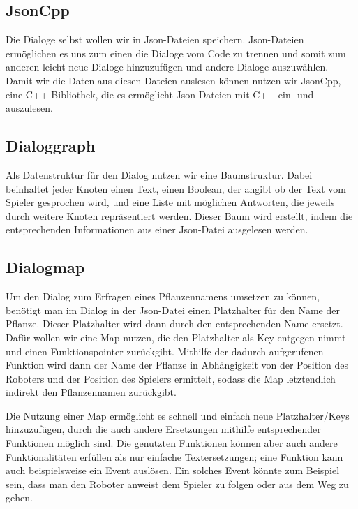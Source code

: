 \subsection{JsonCpp}

Die Dialoge selbst wollen wir in Json-Dateien speichern. Json-Dateien ermöglichen es uns zum einen die Dialoge vom Code zu trennen und somit zum anderen leicht neue Dialoge hinzuzufügen und andere Dialoge auszuwählen. Damit wir die Daten aus diesen Dateien auslesen können nutzen wir JsonCpp, eine C++-Bibliothek, die es ermöglicht Json-Dateien mit C++ ein- und auszulesen. 

\subsection{Dialoggraph}

Als Datenstruktur für den Dialog nutzen wir eine Baumstruktur. Dabei beinhaltet jeder Knoten einen Text, einen Boolean, der angibt ob der Text vom Spieler gesprochen wird, und eine Liste mit möglichen Antworten, die jeweils durch weitere Knoten repräsentiert werden. Dieser Baum wird erstellt, indem die entsprechenden Informationen aus einer Json-Datei ausgelesen werden. 

\subsection{Dialogmap}

Um den Dialog zum Erfragen eines Pflanzennamens umsetzen zu können, benötigt man im Dialog in der Json-Datei einen Platzhalter für den Name der Pflanze. Dieser Platzhalter wird dann durch den entsprechenden Name ersetzt. Dafür wollen wir eine Map nutzen, die den Platzhalter als Key entgegen nimmt und einen Funktionspointer zurückgibt. Mithilfe der dadurch aufgerufenen Funktion wird dann der Name der Pflanze in Abhängigkeit von der Position des Roboters und der Position des Spielers ermittelt, sodass die Map letztendlich indirekt den Pflanzennamen zurückgibt.  
\par
Die Nutzung einer Map ermöglicht es schnell und einfach neue Platzhalter/Keys hinzuzufügen, durch die auch andere Ersetzungen mithilfe entsprechender Funktionen möglich sind. Die genutzten Funktionen können aber auch andere Funktionalitäten erfüllen als nur einfache Textersetzungen; eine Funktion kann auch beispielsweise ein Event auslösen. Ein solches Event könnte zum Beispiel sein, dass man den Roboter anweist dem Spieler zu folgen oder aus dem Weg zu gehen.


